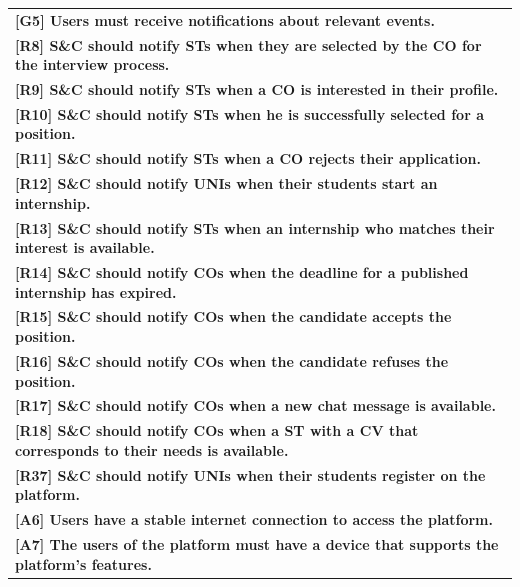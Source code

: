 \begin{center}
    \begin{tabular}{|p{37em}|}
        \rowcolor{bluepoli!40} %
        \hline
        \textbf{[G5] Users must receive notifications about relevant events.} \\
        \rowcolor{bluepoli!15}
        \textbf{[R8] S\&C should notify STs when they are selected by the CO for the interview process.} \\
        \rowcolor{bluepoli!15}
        \textbf{[R9] S\&C should notify STs when a CO is interested in their profile.} \\
        \rowcolor{bluepoli!15}
        \textbf{[R10] S\&C should notify STs when he is successfully selected for a position.} \\
        \rowcolor{bluepoli!15}
        \textbf{[R11] S\&C should notify STs when a CO rejects their application.} \\
        \rowcolor{bluepoli!15}
        \textbf{[R12] S\&C should notify UNIs when their students start an internship.} \\
        \rowcolor{bluepoli!15}
        \textbf{[R13] S\&C should notify STs when an internship who matches their interest is available.} \\
        \rowcolor{bluepoli!15}
        \textbf{[R14] S\&C should notify COs when the deadline for a published internship has expired.} \\
        \rowcolor{bluepoli!15}
        \textbf{[R15] S\&C should notify COs when the candidate accepts the position.} \\
        \rowcolor{bluepoli!15}
        \textbf{[R16] S\&C should notify COs when the candidate refuses the position.} \\
        \rowcolor{bluepoli!15}
        \textbf{[R17] S\&C should notify COs when a new chat message is available.} \\
        \rowcolor{bluepoli!15}
        \textbf{[R18] S\&C should notify COs when a ST with a CV that corresponds to their needs is available.} \\
        \rowcolor{bluepoli!15}
        \textbf{[R37] S\&C should notify UNIs when their students register on the platform.} \\
        \textbf{[A6] Users have a stable internet connection to access the platform.}\\
        \textbf{[A7] The users of the platform must have a device that supports the platform's features.}\\
        \hline
    \end{tabular}
\end{center}

